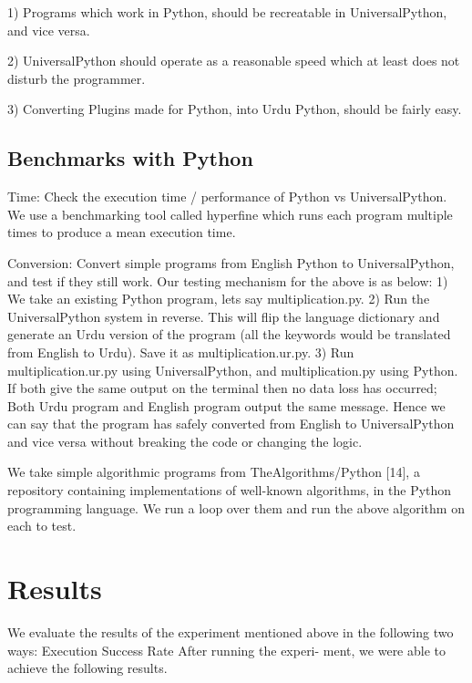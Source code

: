\documentclass[conference]{IEEEtran}
\begin{document}
1) Programs which work in Python, should be recreatable in UniversalPython, and vice versa.

2) UniversalPython should operate as a reasonable speed which at least does not disturb the programmer.

3) Converting Plugins made for Python, into Urdu
Python, should be fairly easy.

\subsection{Benchmarks with Python}\label{AA}

Time: Check the execution time / performance of Python vs UniversalPython. We use a benchmarking tool called hyperfine which runs each program multiple times to produce a mean execution time.

Conversion: Convert simple programs from English Python to UniversalPython, and test if they still work. Our testing mechanism for the above is as below:
1) We take an existing Python program, lets say multiplication.py.
2) Run the UniversalPython system in reverse. This will flip the language dictionary and generate an Urdu version of the program (all the keywords would be translated from English to Urdu). Save it as multiplication.ur.py.
3) Run multiplication.ur.py using UniversalPython, and multiplication.py using Python. If both give the same output on the terminal then no data loss has occurred; Both Urdu program and English program output the same message. Hence we can say that the program has safely converted from English to UniversalPython and vice versa without breaking the code or changing the logic.

We take simple algorithmic programs from TheAlgorithms/Python [14], a repository containing implementations of well-known algorithms, in the Python programming language. We run a loop over them and run the above algorithm on each to test.

\section{Results}

We evaluate the results of the experiment mentioned above in the following two ways:
Execution Success Rate After running the experi- ment, we were able to achieve the following results.
\end{document}
